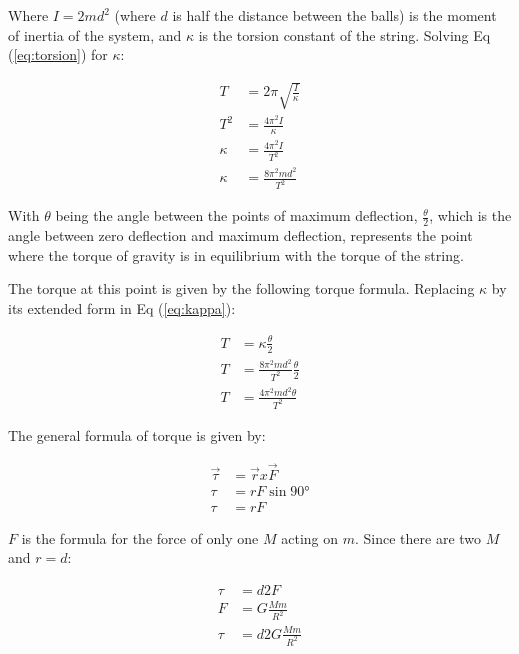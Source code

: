 \documentclass[12pt]{article}
\begin{document}
    Where $I = 2md^2$ (where $d$ is half the distance between the balls) is the moment of inertia of the system, and $\kappa$ is the torsion constant of the string. Solving Eq (\ref{eq:torsion}) for $\kappa$:

    \begin{equation}
        \begin{aligned}
            T&=2\pi\sqrt{\frac{I}{\kappa}}\\ 
            T^2&=\frac{4\pi^2I}{\kappa}\\ 
            \kappa&=\frac{4\pi^2I}{T^2}\\ 
            \kappa&=\frac{8\pi^2md^2}{T^2} \label{eq:kappa} 
        \end{aligned}
    \end{equation}

    With $\theta$ being the angle between the points of maximum deflection, $\frac{\theta}{2}$, which is the angle between zero deflection and maximum deflection, represents the point where the torque of gravity is in equilibrium with the torque of the string. 

    The torque at this point is given by the following torque formula. Replacing $\kappa$ by its extended form in Eq (\ref{eq:kappa}):

    \begin{align}
        T&=\kappa\frac{\theta}{2}\nonumber\\ 
        T&=\frac{8\pi^2md^2}{T^2}  \frac{\theta}{2} \nonumber\\
        T&=\frac{4\pi^2md^2\theta}{T^2} \label{eq:torque}
    \end{align}

    The general formula of torque is given by:

    \begin{equation}
        \begin{aligned}
            \vec{\tau}&= \vec{r} x \vec{F}\\
            \tau&=rF \sin{\ang{90}}\\
            \tau&=rF
        \end{aligned}
    \end{equation}

    $F$ is the formula for the force of only one $M$ acting on $m$. Since there are two $M$ and $r = d$:

    \begin{align}
        \tau&=d2F\nonumber\\ 
        F&=G\frac{Mm}{R^2}\nonumber\\
        \tau&=d2G\frac{Mm}{R^2} \label {eq:torque2}
    \end{align}
\end{document}
